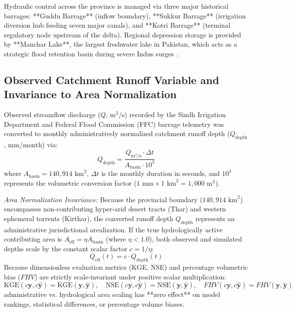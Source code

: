 \documentclass[11pt,a4paper,fleqn]{article}
\begin{document}
Hydraulic control across the province is managed via three major historical barrages: **Guddu Barrage** (inflow boundary), **Sukkur Barrage** (irrigation diversion hub feeding seven major canals), and **Kotri Barrage** (terminal regulatory node upstream of the delta). Regional depression storage is provided by **Manchar Lake**, the largest freshwater lake in Pakistan, which acts as a strategic flood retention basin during severe Indus surges \citep{hashmi2022hydrodynamic}.

\subsection{Observed Catchment Runoff Variable and Invariance to Area Normalization}

Observed streamflow discharge ($Q$, $\text{m}^3/\text{s}$) recorded by the Sindh Irrigation Department and Federal Flood Commission (FFC) barrage telemetry was converted to monthly administratively normalized catchment runoff depth ($Q_{\text{depth}}$, $\text{mm/month}$) via:
\begin{equation}
Q_{\text{depth}} = \frac{Q_{\text{m}^3/\text{s}} \cdot \Delta t}{A_{\text{basin}} \cdot 10^3}
\end{equation}
where $A_{\text{basin}} = 140,914\text{ km}^2$, $\Delta t$ is the monthly duration in seconds, and $10^3$ represents the volumetric conversion factor ($1\text{ mm} \times 1\text{ km}^2 = 1,000\text{ m}^3$). 

\textit{Area Normalization Invariance:} Because the provincial boundary ($140,914\text{ km}^2$) encompasses non-contributing hyper-arid desert tracts (Thar) and western ephemeral torrents (Kirthar), the converted runoff depth $Q_{\text{depth}}$ represents an administrative jurisdictional arealization. If the true hydrologically active contributing area is $A_{\text{eff}} = \eta A_{\text{basin}}$ (where $\eta < 1.0$), both observed and simulated depths scale by the constant scalar factor $c = 1/\eta$:
\begin{equation}
Q_{\text{eff}}(t) = c \cdot Q_{\text{depth}}(t)
\end{equation}
Because dimensionless evaluation metrics (KGE, NSE) and percentage volumetric bias ($FHV$) are strictly scale-invariant under positive scalar multiplication:
\begin{equation}
\text{KGE}(c \mathbf{y}, c \hat{\mathbf{y}}) = \text{KGE}(\mathbf{y}, \hat{\mathbf{y}}), \quad \text{NSE}(c \mathbf{y}, c \hat{\mathbf{y}}) = \text{NSE}(\mathbf{y}, \hat{\mathbf{y}}), \quad FHV(c \mathbf{y}, c \hat{\mathbf{y}}) = FHV(\mathbf{y}, \hat{\mathbf{y}})
\end{equation}
administrative vs. hydrological area scaling has **zero effect** on model rankings, statistical differences, or percentage volume biases.
\end{document}
